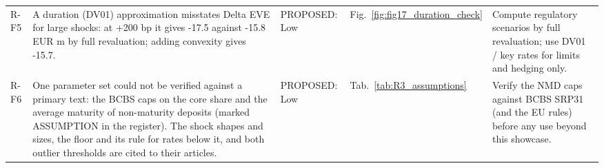\begin{table}[H]
\begin{tabular}{>{\raggedright\arraybackslash}p{0.75cm}>{\raggedright\arraybackslash}p{6.6cm}>{\raggedright\arraybackslash}p{1.85cm}>{\raggedright\arraybackslash}p{2.4cm}>{\raggedright\arraybackslash}p{3.5cm}}
R-F5 & A duration (DV01) approximation misstates Delta EVE for large shocks: at +200 bp it gives -17.5 against -15.8 EUR m by full revaluation; adding convexity gives -15.7. & PROPOSED: Low & Fig.~\ref{fig:fig17_duration_check} & Compute regulatory scenarios by full revaluation; use DV01 / key rates for limits and hedging only. \\
R-F6 & One parameter set could not be verified against a primary text: the BCBS caps on the core share and the average maturity of non-maturity deposits (marked ASSUMPTION in the register). The shock shapes and sizes, the floor and its rule for rates below it, and both outlier thresholds are cited to their articles. & PROPOSED: Low & Tab.~\ref{tab:R3_assumptions} & Verify the NMD caps against BCBS SRP31 (and the EU rules) before any use beyond this showcase. \\
\bottomrule
\end{tabular}
\end{table}
